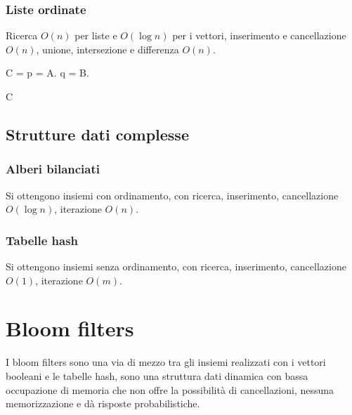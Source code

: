 \subsubsection{Liste ordinate}
Ricerca $O(n)$ per liste e $O(\log n)$ per i vettori, inserimento e cancellazione $O(n)$, unione, intersezione e differenza $O(n)$.\\
\begin{algorithm}[H]
\DontPrintSemicolon
{}
\caption{\protect\Set \protect{}}

\Set C = \Set{}\;
\Pos p = A.\Head{}\;
\Pos q = B.\Head{}\;

\Return C\;
\end{algorithm}
\subsection{Strutture dati complesse}
\subsubsection{Alberi bilanciati}
Si ottengono insiemi con ordinamento, con ricerca, inserimento, cancellazione $O(\log n)$, iterazione $O(n)$.
\subsubsection{Tabelle hash}
Si ottengono insiemi senza ordinamento, con ricerca, inserimento, cancellazione $O(1)$, iterazione $O(m)$. 
\section{Bloom filters}
I bloom filters sono una via di mezzo tra gli insiemi realizzati con i vettori booleani e le tabelle hash, sono una struttura dati dinamica con bassa
occupazione di memoria che non offre la possibilit\`a di cancellazioni, nessuna memorizzazione e d\`a risposte probabilistiche. 
